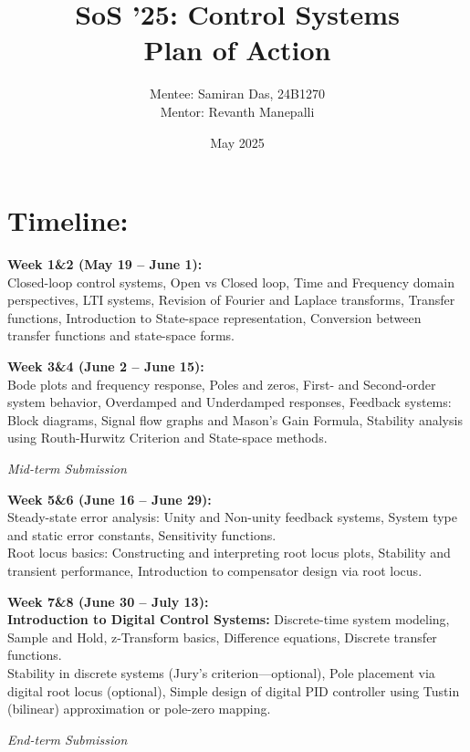 \documentclass{article}
\title{SoS '25: Control Systems\\\large Plan of Action}
\author{Mentee: Samiran Das, 24B1270\\
Mentor: Revanth Manepalli}
\date{May 2025}
\begin{document}
\maketitle

\section{Timeline:}

\textbf{Week 1\&2 (May 19 – June 1):} \\
Closed-loop control systems, Open vs Closed loop, Time and Frequency domain perspectives, LTI systems, Revision of Fourier and Laplace transforms, Transfer functions, Introduction to State-space representation, Conversion between transfer functions and state-space forms.

\vspace{0.5em}
\textbf{Week 3\&4 (June 2 – June 15):} \\
Bode plots and frequency response, Poles and zeros, First- and Second-order system behavior, Overdamped and Underdamped responses, Feedback systems: Block diagrams, Signal flow graphs and Mason’s Gain Formula, Stability analysis using Routh-Hurwitz Criterion and State-space methods.

\vspace{1em}
\textit{Mid-term Submission}

\vspace{1em}
\textbf{Week 5\&6 (June 16 – June 29):} \\
Steady-state error analysis: Unity and Non-unity feedback systems, System type and static error constants, Sensitivity functions. \\
Root locus basics: Constructing and interpreting root locus plots, Stability and transient performance, Introduction to compensator design via root locus.

\vspace{0.5em}
\textbf{Week 7\&8 (June 30 – July 13):} \\
\textbf{Introduction to Digital Control Systems:} Discrete-time system modeling, Sample and Hold, z-Transform basics, Difference equations, Discrete transfer functions. \\
Stability in discrete systems (Jury’s criterion—optional), Pole placement via digital root locus (optional), Simple design of digital PID controller using Tustin (bilinear) approximation or pole-zero mapping.

\vspace{1em}
\textit{End-term Submission}
\end{document}

